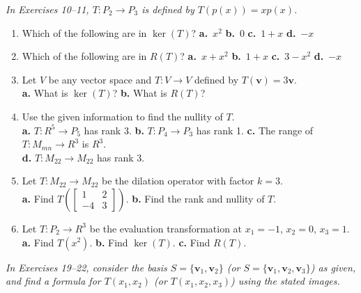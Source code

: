 \documentclass{article}
\begin{document}
\noindent\textit{In Exercises 10--11, $T : P_2 \to P_3$ is defined by $T(p(x)) = xp(x)$.}

\begin{enumerate}
  \item[10.] Which of the following are in $\ker(T)$?
        \quad \textbf{a.}~$x^2$ \quad \textbf{b.}~$0$ \quad \textbf{c.}~$1+x$ \quad \textbf{d.}~$-x$

  \item[11.] Which of the following are in $R(T)$?
        \quad \textbf{a.}~$x+x^2$ \quad \textbf{b.}~$1+x$ \quad \textbf{c.}~$3-x^2$ \quad \textbf{d.}~$-x$

  \item[12.] Let $V$ be any vector space and $T : V \to V$ defined by $T(\mathbf{v}) = 3\mathbf{v}$.\\
        \textbf{a.} What is $\ker(T)$? \quad \textbf{b.} What is $R(T)$?

  \item[13.] Use the given information to find the nullity of $T$.\\
        \textbf{a.} $T : R^5 \to P_5$ has rank 3. \quad
        \textbf{b.} $T : P_4 \to P_3$ has rank 1. \quad
        \textbf{c.} The range of $T : M_{mn} \to R^3$ is $R^3$.\\
        \textbf{d.} $T : M_{22} \to M_{22}$ has rank 3.

  \item[15.] Let $T : M_{22} \to M_{22}$ be the dilation operator with factor $k = 3$.\\
        \textbf{a.} Find $T\!\left(\begin{bmatrix}1&2\\-4&3\end{bmatrix}\right)$.
        \quad \textbf{b.} Find the rank and nullity of $T$.

  \item[17.] Let $T : P_2 \to R^3$ be the evaluation transformation at
        $x_1=-1$, $x_2=0$, $x_3=1$.\\
        \textbf{a.} Find $T(x^2)$. \quad
        \textbf{b.} Find $\ker(T)$. \quad
        \textbf{c.} Find $R(T)$.

\end{enumerate}

\noindent\textit{In Exercises 19--22, consider the basis $S = \{\mathbf{v}_1, \mathbf{v}_2\}$
(or $S=\{\mathbf{v}_1,\mathbf{v}_2,\mathbf{v}_3\}$) as given, and find a formula for
$T(x_1,x_2)$ (or $T(x_1,x_2,x_3)$) using the stated images.}
\end{document}
